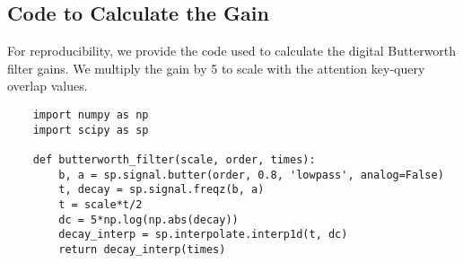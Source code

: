 \subsection{Code to Calculate the Gain}
For reproducibility, we provide the code used to calculate the digital Butterworth filter gains.
We multiply the gain by 5 to scale with the attention key-query overlap values.

\begin{verbatim}
    import numpy as np
    import scipy as sp
    
    def butterworth_filter(scale, order, times):
        b, a = sp.signal.butter(order, 0.8, 'lowpass', analog=False)
        t, decay = sp.signal.freqz(b, a)
        t = scale*t/2
        dc = 5*np.log(np.abs(decay))
        decay_interp = sp.interpolate.interp1d(t, dc)
        return decay_interp(times)
\end{verbatim}
